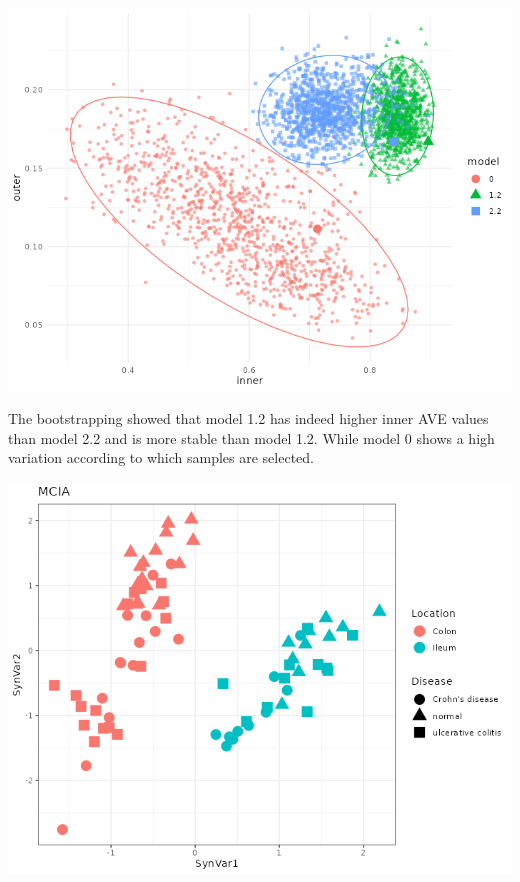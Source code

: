 \documentclass[
  a4paper,
]{book}
\let\origfigure\figure
\let\endorigfigure\endfigure
\renewenvironment{figure}[1][2] {
    \expandafter\origfigure\expandafter[!ht]
} {
    \endorigfigure
}
\begin{document}
\begin{figure}
\centering
\includegraphics{images/howells_models_bootstrap.png}
\caption{\label{fig:howell-bootstrap} Bootstrap of the different models on the inner and outer AVE: Model 0 has just trancriptomic and microbiome data, model 1.2 has transcriptomic, microbiome and sample data and model 2.2 has transcriptomic, microbiome and sample data split in different blocks. The bigger points are the models on the original dataset.}
\end{figure}

The bootstrapping showed that model 1.2 has indeed higher inner AVE values than model 2.2 and is more stable than model 1.2.
While model 0 shows a high variation according to which samples are selected.

\begin{figure}
\includegraphics[width=1\linewidth]{images/howell-mcia} \caption[MCIA method on Howell's dataset.]{MCIA method on Howell's dataset. The first dimensions separates by location.}\label{fig:howell-mcia}
\end{figure}
\end{document}
